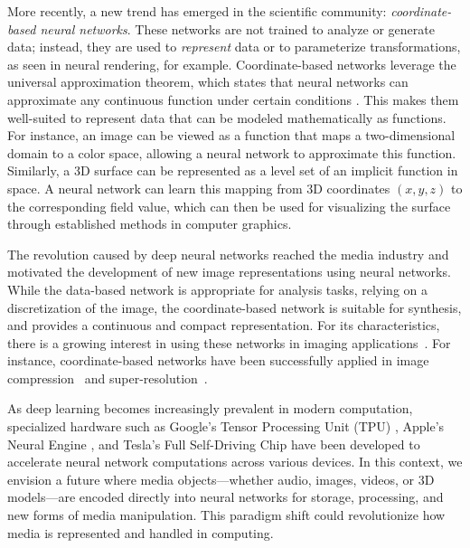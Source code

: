 More recently, a new trend has emerged in the scientific community: \textit{coordinate-based neural networks}. These networks are not trained to analyze or generate data; instead, they are used to \textit{represent} data or to parameterize transformations, as seen in neural rendering, for example. Coordinate-based networks leverage the universal approximation theorem, which states that neural networks can approximate any continuous function under certain conditions \citep{HORNIK1989359,cybenko89}. This makes them well-suited to represent data that can be modeled mathematically as functions. For instance, an image can be viewed as a function that maps a two-dimensional domain to a color space, allowing a neural network to approximate this function. Similarly, a 3D surface can be represented as a level set of an implicit function in space. A neural network can learn this mapping from 3D coordinates \((x, y, z)\) to the corresponding field value, which can then be used for visualizing the surface through established methods in computer graphics.

The revolution caused by deep neural networks reached the media industry and motivated the development of new image representations using neural networks. While the data-based network is appropriate for analysis tasks, relying on a discretization of the image, the coordinate-based network is suitable for synthesis, and provides a continuous and compact representation. For its characteristics, there is a growing interest in using these networks in imaging applications~\cite{xie2022neural}. For instance, coordinate-based networks have been successfully applied in image compression~\cite{dupont2021coin} and super-resolution~\cite{czerkawski2021neural}.

As deep learning becomes increasingly prevalent in modern computation, specialized hardware such as Google's Tensor Processing Unit (TPU) \citep{googleTPU}, Apple's Neural Engine \citep{appleNeural}, and Tesla's Full Self-Driving Chip \citep{Talpes2020Tesla} have been developed to accelerate neural network computations across various devices. In this context, we envision a future where media objects—whether audio, images, videos, or 3D models—are encoded directly into neural networks for storage, processing, and new forms of media manipulation. This paradigm shift could revolutionize how media is represented and handled in computing.


